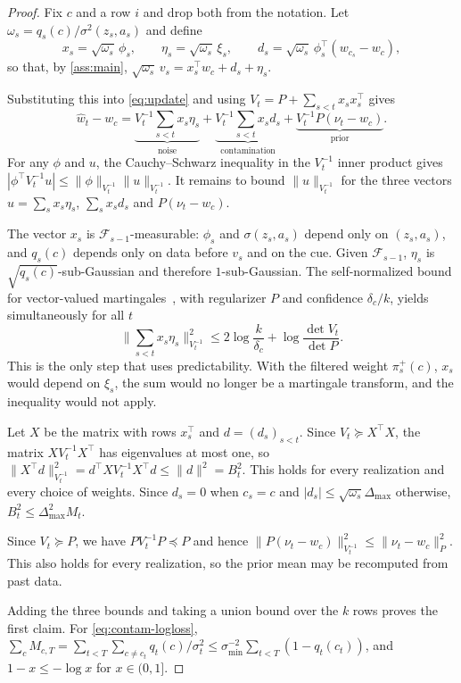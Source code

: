 \begin{proof}
Fix $c$ and a row $i$ and drop both from the notation. Let $\omega_s=q_s(c)/\sigma^2(z_s,a_s)$ and define
\[
  x_s=\sqrt{\omega_s}\,\phi_s,\qquad \eta_s=\sqrt{\omega_s}\,\xi_s,\qquad d_s=\sqrt{\omega_s}\,\phi_s^\top(w_{c_s}-w_c),
\]
so that, by \cref{ass:main}, $\sqrt{\omega_s}\,v_s=x_s^\top w_c+d_s+\eta_s$.

 Substituting this into \cref{eq:update} and using $V_t=P+\sum_{s<t}x_sx_s^\top$ gives
\[
  \widehat w_t-w_c=\underbrace{V_t^{-1}\textstyle\sum_{s<t}x_s\eta_s}_{\text{noise}}+\underbrace{V_t^{-1}\textstyle\sum_{s<t}x_sd_s}_{\text{contamination}}+\underbrace{V_t^{-1}P(\nu_t-w_c)}_{\text{prior}}.
\]
For any $\phi$ and $u$, the Cauchy--Schwarz inequality in the $V_t^{-1}$ inner product gives $|\phi^\top V_t^{-1}u|\le\|\phi\|_{V_t^{-1}}\|u\|_{V_t^{-1}}$. It remains to bound $\|u\|_{V_t^{-1}}$ for the three vectors $u=\sum_s x_s\eta_s$, $\sum_s x_sd_s$ and $P(\nu_t-w_c)$.

 The vector $x_s$ is $\mathcal F_{s-1}$-measurable: $\phi_s$ and $\sigma(z_s,a_s)$ depend only on $(z_s,a_s)$, and $q_s(c)$ depends only on data before $v_s$ and on the cue. Given $\mathcal F_{s-1}$, $\eta_s$ is $\sqrt{q_s(c)}$-sub-Gaussian and therefore $1$-sub-Gaussian. The self-normalized bound for vector-valued martingales~\citep[Thm.~1]{abbasi2011improved}, with regularizer $P$ and confidence $\delta_c/k$, yields simultaneously for all $t$
\[
  \Big\|\textstyle\sum_{s<t}x_s\eta_s\Big\|^2_{V_t^{-1}}\le2\log\frac{k}{\delta_c}+\log\frac{\det V_t}{\det P}.
\]
This is the only step that uses predictability. With the filtered weight $\pi^+_s(c)$, $x_s$ would depend on $\xi_s$, the sum would no longer be a martingale transform, and the inequality would not apply.

 Let $X$ be the matrix with rows $x_s^\top$ and $d=(d_s)_{s<t}$. Since $V_t\succeq X^\top X$, the matrix $XV_t^{-1}X^\top$ has eigenvalues at most one, so $\|X^\top d\|^2_{V_t^{-1}}=d^\top XV_t^{-1}X^\top d\le\|d\|^2=B_t^2$. This holds for every realization and every choice of weights. Since $d_s=0$ when $c_s=c$ and $|d_s|\le\sqrt{\omega_s}\Delta_{\max}$ otherwise, $B_t^2\le\Delta_{\max}^2M_t$.

 Since $V_t\succeq P$, we have $PV_t^{-1}P\preceq P$ and hence $\|P(\nu_t-w_c)\|^2_{V_t^{-1}}\le\|\nu_t-w_c\|_P^2$. This also holds for every realization, so the prior mean may be recomputed from past data.

 Adding the three bounds and taking a union bound over the $k$ rows proves the first claim. For \cref{eq:contam-logloss}, $\sum_cM_{c,T}=\sum_{t<T}\sum_{c\ne c_t}q_t(c)/\sigma^2_t\le\sigma_{\min}^{-2}\sum_{t<T}(1-q_t(c_t))$, and $1-x\le-\log x$ for $x\in(0,1]$.
\end{proof}

